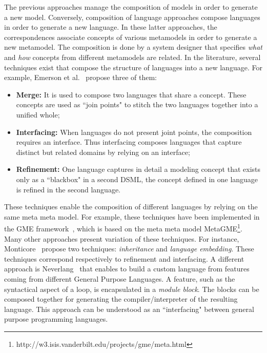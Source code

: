 
The previous approaches manage the composition of models in order to generate a new model. Conversely, composition of language approaches compose languages in order to generate a new language. In these latter approaches, the correspondences associate concepts of various metamodels in order to generate a new metamodel. The composition is done by a system designer that specifies \emph{what} and \emph{how} concepts from different metamodels are related. In the literature, several techniques exist that compose the structure of languages into a new language. For example, Emerson et al.~\cite{metamodelcompo} propose three of them:
\begin{itemize}
	\item \textbf{Merge:} It is used to compose two languages that share a concept. These concepts are used as ``join points" to stitch the two languages together into a unified whole;
	\item \textbf{Interfacing:} When languages do not present joint points, the composition requires an interface. Thus interfacing composes languages that capture distinct but related domains by relying on an interface;
	\item \textbf{Refinement:} One language captures in detail a modeling concept that exists only as a ``blackbox" in a second DSML, \ie the concept defined in one language is refined in the second language.
\end{itemize} 
These techniques enable the composition of different languages by relying on the same meta meta model. For example, these techniques have been implemented in the GME framework~\cite{metamodelcompo}, which is based on the meta meta model MetaGME\footnote{http://w3.isis.vanderbilt.edu/projects/gme/meta.html}. Many other approaches present variation of these techniques. For instance, Monticore~\cite{monticore} propose two techniques: \emph{inheritance} and \emph{language embedding}. These techniques correspond respectively to refinement and interfacing. A different approach is Neverlang~\cite{neverlang} that enables to build a custom language from features coming from different General Purpose Languages. A feature, such as the syntactical aspect of a loop, is encapsulated in a \emph{module block}. The blocks can be composed together for generating the compiler/interpreter of the resulting language. This approach can be understood as an ``interfacing" between general purpose programming languages.

